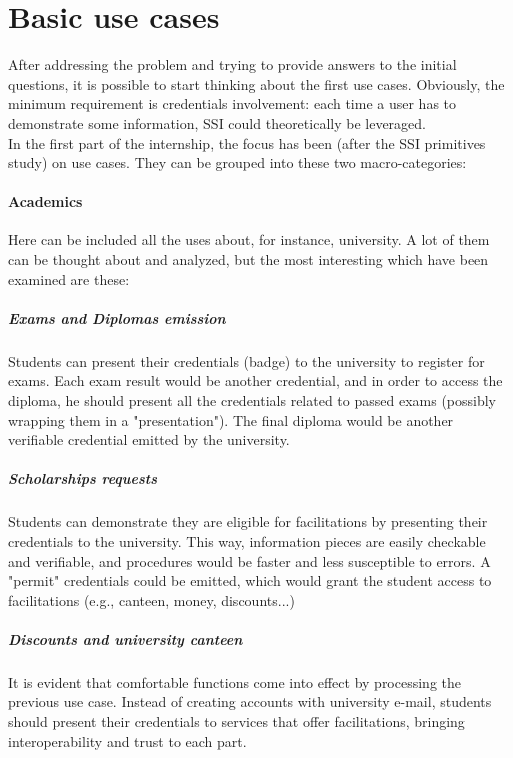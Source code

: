 \section{Basic use cases}
After addressing the problem and trying to provide answers to the initial 
questions, it is possible to start thinking about the first use cases.
Obviously, the minimum requirement is credentials involvement: each time a user 
has to demonstrate some information, SSI could theoretically be leveraged.
\vspace*{0.3cm}\\
In the first part of the internship, the focus has been (after the SSI primitives 
study) on use cases. They can be grouped into these two macro-categories:
\paragraph{Academics}
Here can be included all the uses about, for instance, university. A lot of them 
can be thought about and analyzed, but the most interesting which have been examined 
are these:
    \subparagraph{Exams and Diplomas emission} Students can present 
    their credentials (badge) to the university to register for exams. 
    Each exam result would be another credential, and in order to access the 
    diploma, he should present all the credentials related to passed exams 
    (possibly wrapping them in a "presentation"). The final diploma would 
    be another verifiable credential emitted by the university.
    \subparagraph{Scholarships requests} Students can demonstrate they are 
    eligible for facilitations by presenting their credentials to the university. 
    This way, information pieces are easily checkable and verifiable, and procedures 
    would be faster and less susceptible to errors. A "permit" credentials could be 
    emitted, which would grant the student access to facilitations (e.g., canteen,  
    money, discounts...)
    \subparagraph{Discounts and university canteen} It is evident that comfortable
    functions come into effect by processing the previous use case. Instead of 
    creating accounts with university e-mail, students should present their 
    credentials to services that offer facilitations, bringing interoperability 
    and trust to each part.
